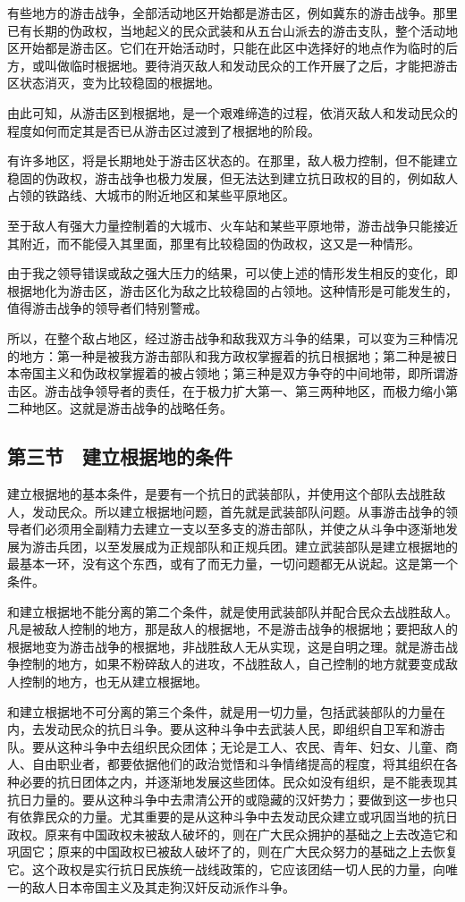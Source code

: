 有些地方的游击战争，全部活动地区开始都是游击区，例如冀东的游击战争。那里已有长期的伪政权，当地起义的民众武装和从五台山派去的游击支队，整个活动地区开始都是游击区。它们在开始活动时，只能在此区中选择好的地点作为临时的后方，或叫做临时根据地。要待消灭敌人和发动民众的工作开展了之后，才能把游击区状态消灭，变为比较稳固的根据地。

由此可知，从游击区到根据地，是一个艰难缔造的过程，依消灭敌人和发动民众的程度如何而定其是否已从游击区过渡到了根据地的阶段。

有许多地区，将是长期地处于游击区状态的。在那里，敌人极力控制，但不能建立稳固的伪政权，游击战争也极力发展，但无法达到建立抗日政权的目的，例如敌人占领的铁路线、大城市的附近地区和某些平原地区。

至于敌人有强大力量控制着的大城市、火车站和某些平原地带，游击战争只能接近其附近，而不能侵入其里面，那里有比较稳固的伪政权，这又是一种情形。

由于我之领导错误或敌之强大压力的结果，可以使上述的情形发生相反的变化，即根据地化为游击区，游击区化为敌之比较稳固的占领地。这种情形是可能发生的，值得游击战争的领导者们特别警戒。

所以，在整个敌占地区，经过游击战争和敌我双方斗争的结果，可以变为三种情况的地方：第一种是被我方游击部队和我方政权掌握着的抗日根据地；第二种是被日本帝国主义和伪政权掌握着的被占领地；第三种是双方争夺的中间地带，即所谓游击区。游击战争领导者的责任，在于极力扩大第一、第三两种地区，而极力缩小第二种地区。这就是游击战争的战略任务。

\subsection{第三节　建立根据地的条件}

建立根据地的基本条件，是要有一个抗日的武装部队，并使用这个部队去战胜敌人，发动民众。所以建立根据地问题，首先就是武装部队问题。从事游击战争的领导者们必须用全副精力去建立一支以至多支的游击部队，并使之从斗争中逐渐地发展为游击兵团，以至发展成为正规部队和正规兵团。建立武装部队是建立根据地的最基本一环，没有这个东西，或有了而无力量，一切问题都无从说起。这是第一个条件。

和建立根据地不能分离的第二个条件，就是使用武装部队并配合民众去战胜敌人。凡是被敌人控制的地方，那是敌人的根据地，不是游击战争的根据地；要把敌人的根据地变为游击战争的根据地，非战胜敌人无从实现，这是自明之理。就是游击战争控制的地方，如果不粉碎敌人的进攻，不战胜敌人，自己控制的地方就要变成敌人控制的地方，也无从建立根据地。

和建立根据地不可分离的第三个条件，就是用一切力量，包括武装部队的力量在内，去发动民众的抗日斗争。要从这种斗争中去武装人民，即组织自卫军和游击队。要从这种斗争中去组织民众团体；无论是工人、农民、青年、妇女、儿童、商人、自由职业者，都要依据他们的政治觉悟和斗争情绪提高的程度，将其组织在各种必要的抗日团体之内，并逐渐地发展这些团体。民众如没有组织，是不能表现其抗日力量的。要从这种斗争中去肃清公开的或隐藏的汉奸势力；要做到这一步也只有依靠民众的力量。尤其重要的是从这种斗争中去发动民众建立或巩固当地的抗日政权。原来有中国政权未被敌人破坏的，则在广大民众拥护的基础之上去改造它和巩固它；原来的中国政权已被敌人破坏了的，则在广大民众努力的基础之上去恢复它。这个政权是实行抗日民族统一战线政策的，它应该团结一切人民的力量，向唯一的敌人日本帝国主义及其走狗汉奸反动派作斗争。

